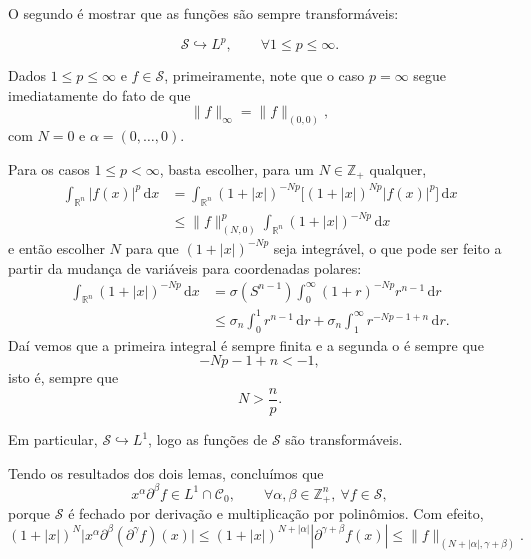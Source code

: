\documentclass[../distribution_theory_notes.tex]{subfiles}
\begin{document}
O segundo é mostrar que as funções são sempre transformáveis:

\begin{lemma*}
	\[
		\mathcal{S}\hookrightarrow L^{p},\qquad \forall 1\leq p\leq \infty .
	\]
\end{lemma*}
\begin{proof*}
	Dados \(1\leq p\leq \infty\) e \(f\in \mathcal{S}\), primeiramente, note que o caso \(p=\infty\) segue imediatamente do fato de que
	\[
		\|f\|_{\infty }=\|f\|_{(0,0)},
	\]
	com \(N=0\) e \(\alpha =(0,\ldots ,0)\).

	Para os casos \(1\leq p<\infty\), basta escolher, para um \(N\in \mathbb{Z}_{+}\) qualquer,
	\begin{align*}
		\int_{\mathbb{R}^{n}}|f(x)|^{p}\,\mathrm{d}x
		 & =\int_{\mathbb{R}^{n}}(1+|x|)^{-Np}\bigl[(1+|x|)^{Np}|f(x)|^{p}\bigr] \,\mathrm{d}x \\
		 & \leq \|f\|_{(N,0)}^{p}\int_{\mathbb{R}^{n}}(1+|x|)^{-Np}\,\mathrm{d}x
	\end{align*}
	e então escolher \(N\) para que \((1+|x|)^{-Np}\) seja integrável, o que pode ser feito a partir da mudança de variáveis para coordenadas polares:
	\begin{align*}
		\int_{\mathbb{R}^{n}}(1+|x|)^{-Np}\,\mathrm{d}x
		 & =\sigma (S^{n-1})\int_{0}^{\infty }(1+r)^{-Np}r^{n-1}\,\mathrm{d}r \\
		 & \leq \sigma _{n}\int_{0}^{1}r^{n-1}\,\mathrm{d}r
		+\sigma _{n}\int_{1}^{\infty }r^{-Np-1+n}\,\mathrm{d}r.
	\end{align*}
	Daí vemos que a primeira integral é sempre finita e a segunda o é sempre que
	\[
		-Np-1+n<-1,
	\]
	isto é, sempre que
	\[
		N>\frac{n}{p}.
	\]
	\qedsymbol
\end{proof*}

\begin{tcolorbox}[
		skin=enhanced,
		title=Observação,
		fonttitle=\bfseries,
		colframe=black,
		colbacktitle=cyan!75!white,
		colback=cyan!15,
		colbacklower=black,
		coltitle=black,
		drop fuzzy shadow
	]
	Em particular, \(\mathcal{S}\hookrightarrow L^{1}\), logo as funções de \(\mathcal{S}\) são transformáveis.
\end{tcolorbox}

Tendo os resultados dos dois lemas, concluímos que
\[
	x^{\alpha }\partial ^{\beta }f\in L^{1}\cap \mathcal{C}_{0},
	\qquad \forall \alpha ,\beta \in \mathbb{Z}_{+}^{n},\ \forall f\in \mathcal{S},
\]
porque \(\mathcal{S}\) é fechado por derivação e multiplicação por polinômios. Com efeito,
\[
	(1+|x|)^{N}\bigl|x^{\alpha }\partial ^{\beta }(\partial ^{\gamma }f)(x)\bigr|
	\leq (1+|x|)^{N+|\alpha |}|\partial ^{\gamma +\beta }f(x)|
	\leq \|f\|_{(N+|\alpha |,\gamma +\beta )}.
\]
\end{document}
